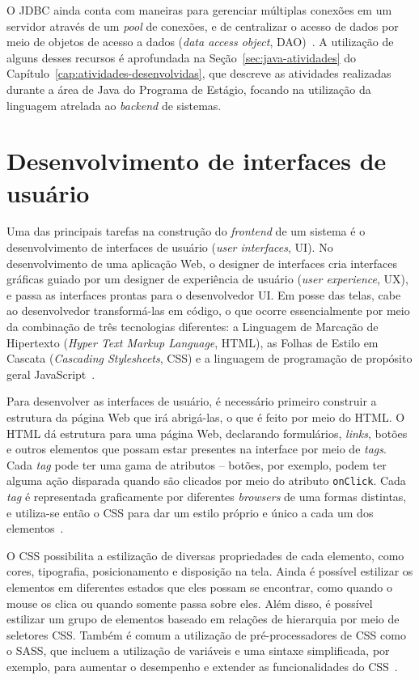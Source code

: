 O JDBC ainda conta com maneiras para gerenciar múltiplas conexões em um servidor através de um \textit{pool} de conexões, e de centralizar o acesso de dados por meio de objetos de acesso a dados (\textit{data access object}, DAO)~\cite{databaseprogramming-2000}. A utilização de alguns desses recursos é aprofundada na Seção~\ref{sec:java-atividades} do Capítulo~\ref{cap:atividades-desenvolvidas}, que descreve as atividades realizadas durante a área de Java do Programa de Estágio, focando na utilização da linguagem atrelada ao \textit{backend} de sistemas.

\section{Desenvolvimento de interfaces de usuário}
\label{sec:ui}

Uma das principais tarefas na construção do \textit{frontend} de um sistema é o desenvolvimento de interfaces de usuário (\textit{user interfaces}, UI). No desenvolvimento de uma aplicação Web, o designer de interfaces cria interfaces gráficas guiado por um designer de experiência de usuário (\textit{user experience}, UX), e passa as interfaces prontas para o desenvolvedor UI. Em posse das telas, cabe ao desenvolvedor transformá-las em código, o que ocorre essencialmente por meio da combinação de três tecnologias diferentes: a Linguagem de Marcação de Hipertexto (\textit{Hyper Text Markup Language}, HTML), as Folhas de Estilo em Cascata (\textit{Cascading Stylesheets}, CSS) e a linguagem de programação de propósito geral JavaScript~\cite{oppermann-2002, stefaner-2009}.

Para desenvolver as interfaces de usuário, é necessário primeiro construir a estrutura da página Web que irá abrigá-las, o que é feito por meio do HTML. O HTML dá estrutura para uma página Web, declarando formulários, \textit{links}, botões e outros elementos que possam estar presentes na interface por meio de \textit{tags}. Cada \textit{tag} pode ter uma gama de atributos – botões, por exemplo, podem ter alguma ação disparada quando são clicados por meio do atributo \verb|onClick|. Cada \textit{tag} é representada graficamente por diferentes \textit{browsers} de uma formas distintas, e utiliza-se então o CSS para dar um estilo próprio e único a cada um dos elementos~\cite{oppermann-2002, stefaner-2009}.

O CSS possibilita a estilização de diversas propriedades de cada elemento, como cores, tipografia, posicionamento e disposição na tela. Ainda é possível estilizar os elementos em diferentes estados que eles possam se encontrar, como quando o mouse os clica ou quando somente passa sobre eles. Além disso, é possível estilizar um grupo de elementos baseado em relações de hierarquia por meio de seletores CSS. Também é comum a utilização de pré-processadores de CSS como o SASS, que incluem a utilização de variáveis e uma sintaxe simplificada, por exemplo, para aumentar o desempenho e extender as funcionalidades do CSS~\cite{stefaner-2009}.

